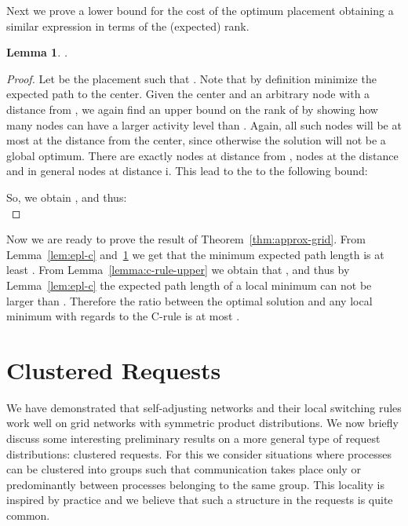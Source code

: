 \documentclass[conference]{IEEEtran}
\newtheorem{lemma}{Lemma}
\begin{document}
Next we prove a lower bound for the cost of the optimum placement obtaining a similar expression in terms of the (expected) rank.

\begin{lemma}\label{lem:c-rule-lower}
.
\end{lemma}
\begin{proof}
Let  be the placement  such that . Note that by definition  minimize the expected path to the center. Given the center  and an arbitrary node  with a distance  from , we again find an upper bound on the rank of  by showing how many nodes can have a larger activity level than . Again, all such nodes will be at most at the distance  from the center, since otherwise the solution will not be a global optimum. There are exactly  nodes at distance  from ,  nodes at the distance  and in general  nodes at distance i. This lead to the to the following bound:

So, we obtain , and thus:\\

\end{proof}

Now we are ready to prove the result of Theorem~\ref{thm:approx-grid}. From Lemma~\ref{lem:epl-c} and~\ref{lem:c-rule-lower} we get that the minimum expected path length is at least . From Lemma~\ref{lemma:c-rule-upper} we obtain that , and thus by Lemma~\ref{lem:epl-c} the expected path length of a local minimum can not be larger than . Therefore the ratio between the optimal solution and any local minimum with regards to the C-rule is at most .








\section{Clustered Requests} \label{sec:cluster}

We have demonstrated that self-adjusting networks and their local switching rules work well on grid networks with symmetric product distributions. We now briefly discuss some interesting preliminary results on a more general type of request distributions: clustered requests. For this we consider situations where processes can be clustered into groups such that communication takes place only or predominantly between processes belonging to the same group. This locality is inspired by practice and we believe that such a structure in the requests is quite common.
\end{document}
